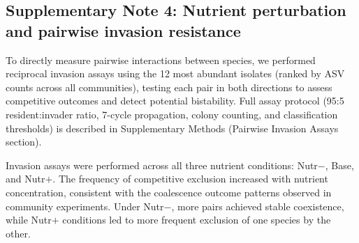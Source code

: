 \subsection*{Supplementary Note 4: Nutrient perturbation and pairwise invasion resistance}
\label{sec:suppl:note4}

To directly measure pairwise interactions between species, we performed reciprocal invasion assays using the 12 most abundant isolates (ranked by ASV counts across all communities), testing each pair in both directions to assess competitive outcomes and detect potential bistability. Full assay protocol (95:5 resident:invader ratio, 7-cycle propagation, colony counting, and classification thresholds) is described in Supplementary Methods (Pairwise Invasion Assays section).

Invasion assays were performed across all three nutrient conditions: Nutr$-$, Base, and Nutr$+$. The frequency of competitive exclusion increased with nutrient concentration, consistent with the coalescence outcome patterns observed in community experiments. Under Nutr$-$, more pairs achieved stable coexistence, while Nutr$+$ conditions led to more frequent exclusion of one species by the other.
